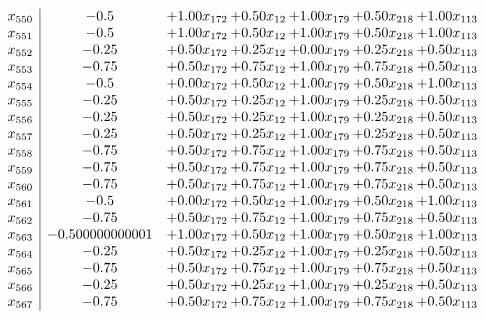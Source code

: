 \documentclass[8pt]{article}
\begin{document}
\[\begin{array}{c| c c@{\hskip 2pt} c@{\hskip 2pt} c@{\hskip 2pt} c@{\hskip 2pt} c@{\hskip 2pt} }
 x_{550}   &  -0.5 & +  1.00 x_{172} & +  0.50 x_{12} & +  1.00 x_{179} & +  0.50 x_{218} & +  1.00 x_{113}\\
 x_{551}   &  -0.5 & +  1.00 x_{172} & +  0.50 x_{12} & +  1.00 x_{179} & +  0.50 x_{218} & +  1.00 x_{113}\\
 x_{552}   &  -0.25 & +  0.50 x_{172} & +  0.25 x_{12} & +  0.00 x_{179} & +  0.25 x_{218} & +  0.50 x_{113}\\
 x_{553}   &  -0.75 & +  0.50 x_{172} & +  0.75 x_{12} & +  1.00 x_{179} & +  0.75 x_{218} & +  0.50 x_{113}\\
 x_{554}   &  -0.5 & +  0.00 x_{172} & +  0.50 x_{12} & +  1.00 x_{179} & +  0.50 x_{218} & +  1.00 x_{113}\\
 x_{555}   &  -0.25 & +  0.50 x_{172} & +  0.25 x_{12} & +  1.00 x_{179} & +  0.25 x_{218} & +  0.50 x_{113}\\
 x_{556}   &  -0.25 & +  0.50 x_{172} & +  0.25 x_{12} & +  1.00 x_{179} & +  0.25 x_{218} & +  0.50 x_{113}\\
 x_{557}   &  -0.25 & +  0.50 x_{172} & +  0.25 x_{12} & +  1.00 x_{179} & +  0.25 x_{218} & +  0.50 x_{113}\\
 x_{558}   &  -0.75 & +  0.50 x_{172} & +  0.75 x_{12} & +  1.00 x_{179} & +  0.75 x_{218} & +  0.50 x_{113}\\
 x_{559}   &  -0.75 & +  0.50 x_{172} & +  0.75 x_{12} & +  1.00 x_{179} & +  0.75 x_{218} & +  0.50 x_{113}\\
 x_{560}   &  -0.75 & +  0.50 x_{172} & +  0.75 x_{12} & +  1.00 x_{179} & +  0.75 x_{218} & +  0.50 x_{113}\\
 x_{561}   &  -0.5 & +  0.00 x_{172} & +  0.50 x_{12} & +  1.00 x_{179} & +  0.50 x_{218} & +  1.00 x_{113}\\
 x_{562}   &  -0.75 & +  0.50 x_{172} & +  0.75 x_{12} & +  1.00 x_{179} & +  0.75 x_{218} & +  0.50 x_{113}\\
 x_{563}   &  -0.500000000001 & +  1.00 x_{172} & +  0.50 x_{12} & +  1.00 x_{179} & +  0.50 x_{218} & +  1.00 x_{113}\\
 x_{564}   &  -0.25 & +  0.50 x_{172} & +  0.25 x_{12} & +  1.00 x_{179} & +  0.25 x_{218} & +  0.50 x_{113}\\
 x_{565}   &  -0.75 & +  0.50 x_{172} & +  0.75 x_{12} & +  1.00 x_{179} & +  0.75 x_{218} & +  0.50 x_{113}\\
 x_{566}   &  -0.25 & +  0.50 x_{172} & +  0.25 x_{12} & +  1.00 x_{179} & +  0.25 x_{218} & +  0.50 x_{113}\\
 x_{567}   &  -0.75 & +  0.50 x_{172} & +  0.75 x_{12} & +  1.00 x_{179} & +  0.75 x_{218} & +  0.50 x_{113}\\

\end{array}\]
\end{document}
